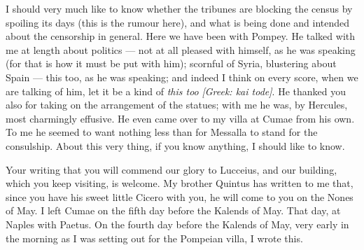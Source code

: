 

 I should very much like to know whether the tribunes are blocking the census by spoiling its days (this is the rumour here), and what is being done and intended about the censorship in general. Here we have been with Pompey. He talked with me at length about politics --- not at all pleased with himself, as he was speaking (for that is how it must be put with him); scornful of Syria, blustering about Spain --- this too, as he was speaking; and indeed I think on every score, when we are talking of him, let it be a kind of \textit{this too} \textit{[Greek: kai tode]}. He thanked you also for taking on the arrangement of the statues; with me he was, by Hercules, most charmingly effusive. He even came over to my villa at Cumae from his own. To me he seemed to want nothing less than for Messalla to stand for the consulship. About this very thing, if you know anything, I should like to know.

 Your writing that you will commend our glory to Lucceius, and our building, which you keep visiting, is welcome. My brother Quintus has written to me that, since you have his sweet little Cicero with you, he will come to you on the Nones of May. I left Cumae on the fifth day before the Kalends of May. That day, at Naples with Paetus. On the fourth day before the Kalends of May, very early in the morning as I was setting out for the Pompeian villa, I wrote this.
